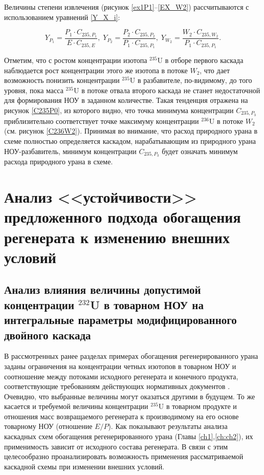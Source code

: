 Величины степени извлечения (рисунок \ref{ex1P1}--\ref{EX_W2}) рассчитываются с использованием уравнений \ref{Y_X_i}: 

\begin{equation}\label{Y_X_i}
    Y_{P_1} = \frac{P_1 \cdot C_{235,{P_1}}}{E \cdot C_{235,{E}}} ,\; 
    Y_{P_2} = \frac{P_2 \cdot C_{235,{P_2}}}{P_1 \cdot C_{235,{P_1}}} ,\; 
    Y_{W_2} = \frac{W_2 \cdot C_{235,{W_2}}}{P_1 \cdot C_{235,{P_1}}}.
\end{equation}

Отметим, что с ростом концентрации изотопа $^{235}$U в отборе первого каскада наблюдается рост концентрации этого же изотопа в потоке $W_2$, что дает возможность понизить концентрации $^{235}$U в разбавителе, по-видимому, до того уровня, пока масса $^{235}$U в потоке отвала второго каскада не станет недостаточной для формирования НОУ в заданном количестве. Такая тенденция отражена на рисунок \ref{C235P0}, из которого видно, что точка минимума концентрации $C_{235,{P_3}}$ приблизительно соответствует точке максимуму концентрации $^{236}$U в потоке $W_2$ (см. рисунок \ref{C236W2}). Принимая во внимание, что расход природного урана в схеме полностью определяется каскадом, нарабатывающим из природного урана НОУ-разбавитель, минимум концентрации $C_{235,{P_3}}$ будет означать минимум расхода природного урана в схеме.


\section{Анализ <<устойчивости>> предложенного подхода обогащения регенерата к изменению внешних условий}
\subsection{Анализ влияния величины допустимой концентрации $^{232}$U в товарном НОУ на интегральные параметры модифицированного двойного каскада}

В рассмотренных ранее разделах примерах обогащения регенерированного урана заданы ограничения на концентрации четных изотопов в товарном НОУ и соотношение между потоками исходного регенерата и конечного продукта, соответствующие требованиям действующих нормативных документов  \cite{smirnovEvolutionIsotopicComposition2012,smirnovKaskadnyeShemyZadachah2012}. Очевидно, что выбранные величины могут оказаться другими в будущем. То же касается и требуемой величины концентрации $^{235}$U в товарном продукте и отношения масс возвращаемого регенерата к производимому на его основе товарному НОУ (отношение $E/P$). Как показывают результаты анализа каскадных схем обогащения регенерированного урана (Главы \ref{ch1},\ref{ch:ch2}), их применимость зависит от исходного состава регенерата. В связи с этим целесообразно проанализировать возможность применения рассматриваемой каскадной схемы при изменении внешних условий.

